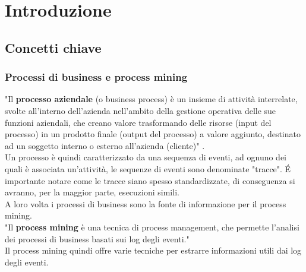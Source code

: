 
\chapter{Introduzione}
\label{cap:introduzione}

%
%
%


\section{Concetti chiave}
\subsection{Processi di business e process mining}
"Il \textbf{processo aziendale} (o business process) è un insieme di attività interrelate, svolte all'interno dell'azienda nell'ambito della gestione operativa delle sue funzioni aziendali, che creano valore trasformando delle risorse (input del processo) in un prodotto finale (output del processo) a valore aggiunto, destinato ad un soggetto interno o esterno all'azienda (cliente)" \cite{site:wiki-business-process}.
\\ 
Un processo è quindi caratterizzato da una sequenza di eventi, ad ognuno dei quali è associata un'attività, le sequenze di eventi sono denominate "tracce". \'E importante notare come le tracce siano spesso standardizzate, di conseguenza si avranno, per la maggior parte, esecuzioni simili.
\\ 
A loro volta i processi di business sono la fonte di informazione per il process mining. 
\\
"Il \textbf{process mining} è una tecnica di process management, che permette l'analisi dei processi di business basati sui log degli eventi." \cite{site:wiki-process-mining}
\\
Il process mining quindi offre varie tecniche per estrarre informazioni utili dai log degli eventi. 



